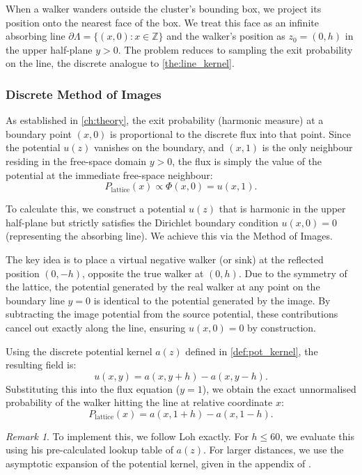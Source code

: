 \documentclass[12pt, a4paper, oneside]{report}
\theoremstyle{remark}
\newtheorem{remark}[theorem]{Remark}
\begin{document}
When a walker wanders outside the cluster's bounding box, we project its position onto the nearest face of the box. We treat this face as an infinite absorbing line $\partial \Lambda = \{(x, 0) : x \in \mathbb{Z}\}$ and the walker's position as $z_0 = (0, h)$ in the upper half-plane $y > 0$. The problem reduces to sampling the exit probability on the line, the discrete analogue to \cref{the:line_kernel}.

\subsubsection{Discrete Method of Images}
As established in \cref{ch:theory}, the exit probability (harmonic measure) at a boundary point $(x,0)$ is proportional to the discrete flux into that point. Since the potential $u(z)$ vanishes on the boundary, and $(x,1)$ is the only neighbour residing in the free-space domain $y>0$, the flux is simply the value of the potential at the immediate free-space neighbour:
\begin{equation*}
    P_{\text{lattice}}(x) \propto \Phi(x, 0) = u(x, 1).
\end{equation*}

To calculate this, we construct a potential $u(z)$ that is harmonic in the upper half-plane but strictly satisfies the Dirichlet boundary condition $u(x, 0) = 0$ (representing the absorbing line). We achieve this via the Method of Images.

The key idea is to place a virtual negative walker (or sink) at the reflected position $(0, -h)$, opposite the true walker at $(0, h)$. Due to the symmetry of the lattice, the potential generated by the real walker at any point on the boundary line $y=0$ is identical to the potential generated by the image. By subtracting the image potential from the source potential, these contributions cancel out exactly along the line, ensuring $u(x, 0) = 0$ by construction.

Using the discrete potential kernel $a(z)$ defined in \cref{def:pot_kernel}, the resulting field is:
\begin{equation*}
    u(x, y) = a(x, y + h) - a(x, y - h).
\end{equation*}
Substituting this into the flux equation ($y=1$), we obtain the exact unnormalised probability of the walker hitting the line at relative coordinate $x$:
\begin{equation*}
    P_{\text{lattice}}(x) = a(x, 1+h) - a(x, 1-h).
\end{equation*}
\begin{remark}
To implement this, we follow Loh exactly. For $h \le 60$, we evaluate this using his pre-calculated lookup table of $a(z)$. For larger distances, we use the asymptotic expansion of the potential kernel, given in the appendix of \cite{Loh2014}.
\end{remark}
\end{document}
